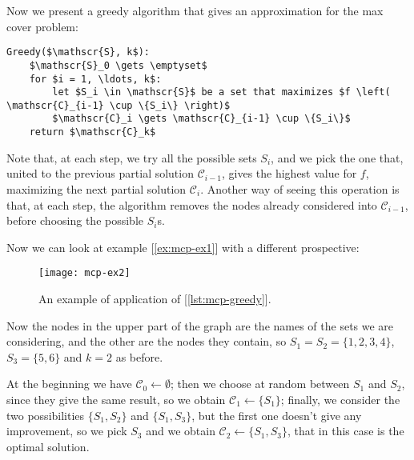 Now we present a greedy algorithm that gives an approximation for the max cover problem:
\begin{lstlisting}[caption={The Greedy algorithm to solve the densest subgraph problem},label={lst:mcp-greedy}]
Greedy($\mathscr{S}, k$):
    $\mathscr{S}_0 \gets \emptyset$
    for $i = 1, \ldots, k$:
        let $S_i \in \mathscr{S}$ be a set that maximizes $f \left( \mathscr{C}_{i-1} \cup \{S_i\} \right)$
        $\mathscr{C}_i \gets \mathscr{C}_{i-1} \cup \{S_i\}$
    return $\mathscr{C}_k$
\end{lstlisting}

Note that, at each step, we try all the possible sets $S_i$, and we pick the one that, united to the previous partial solution $\mathscr{C}_{i-1}$, gives the highest value for $f$, maximizing the next partial solution $\mathscr{C}_i$. Another way of seeing this operation is that, at each step, the algorithm removes the nodes already considered into $\mathscr{C}_{i-1}$, before choosing the possible $S_i$s.

\begin{ex}
    Now we can look at example [\ref{ex:mcp-ex1}] with a different prospective:
    
    \begin{figure}[h!]
        \centering
        \texttt{[image: mcp-ex2]}
        \caption{An example of application of [\ref{lst:mcp-greedy}].}
        \label{fig:mcp-ex2}
    \end{figure}

    Now the nodes in the upper part of the graph are the names of the sets we are considering, and the other are the nodes they contain, so $S_1 = S_2 = \{1,2,3,4\}$, $S_3 = \{5,6\}$ and $k=2$ as before.
    
    At the beginning we have $\mathscr{C}_0 \gets \emptyset$; then we choose at random between $S_1$ and $S_2$, since they give the same result, so we obtain $\mathscr{C}_1 \gets \{S_1\}$; finally, we consider the two possibilities $\{S_1, S_2\}$ and $\{S_1, S_3\}$, but the first one doesn't give any improvement, so we pick $S_3$ and we obtain $\mathscr{C}_2 \gets \{S_1, S_3\}$, that in this case is the optimal solution.
\end{ex}

